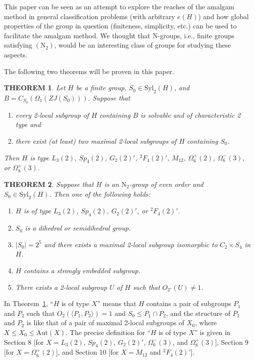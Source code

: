 \documentclass[11pt]{article}
\theoremstyle{plain}
\newtheorem{mainthm}{THEOREM}
\theoremstyle{stmplain}
\newcommand{\N}{\mathrm{N}}
\begin{document}
This paper can be seen as an attempt to explore the reaches of the amalgam
method in general classification problems (with arbitrary $e(H)$) and how
global properties of the group in question (finiteness, simplicity, etc.) can
be used to facilitate the amalgam method. We thought that $\N$-groups, i.e.,
finite groups satisfying $(\N_2)$, would be an interesting class of groups for
studying these aspects.

\noindent The following two theorems will be proven in this paper.

\begin{mainthm}\label{thm:1}
Let $H$ be a finite group, $S_0 \in \mathrm{Syl}_2(H)$, and
$B = C_{S_0}(\Omega_1(ZJ(S_0)))$. Suppose that
\begin{enumerate}
\item[(i)] every 2-local subgroup of $H$ containing $B$ is solvable and of
  characteristic 2 type and
\item[(ii)] there exist (at least) two maximal 2-local subgroups of $H$
  containing $S_0$.
\end{enumerate}
Then $H$ is type $L_3(2)$, $Sp_4(2)$, $G_2(2)'$, ${}^2F_4(2)'$, $M_{12}$,
$\Omega_6^+(2)$, $\Omega_6^-(3)$, or $\Omega_8^+(3)$.
\end{mainthm}

\begin{mainthm}\label{thm:2}
Suppose that $H$ is an $\N_2$-group of even order and $S_0 \in \mathrm{Syl}_2(H)$.
Then one of the following holds:
\begin{enumerate}
\item[(a)] $H$ is of type $L_3(2)$, $Sp_4(2)$, $G_2(2)'$, or ${}^2F_4(2)'$.
\item[(b)] $S_0$ is a dihedral or semidihedral group.
\item[(c)] $|S_0| = 2^5$ and there exists a maximal 2-local subgroup isomorphic to $C_2 \times S_4$ in $H$.
\item[(d)] $H$ contains a strongly embedded subgroup.
\item[(e)] There exists a 2-local subgroup $U$ of $H$ such that $O_{2'}(U) \ne 1$.
\end{enumerate}
\end{mainthm}

\noindent In Theorem~\ref{thm:1}, ``$H$ is of type $X$'' means that $H$ contains a
pair of subgroups $P_1$ and $P_2$ such that $O_2(\langle P_1, P_2 \rangle) = 1$
and $S_0 \le P_1 \cap P_2$, and the structure of $P_1$ and $P_2$ is like that
of a pair of maximal 2-local subgroups of $X_0$, where $X \le X_0 \le
\mathrm{Aut}(X)$. The precise definition for ``$H$ is of type $X$'' is given in
Section 8 [for $X = L_3(2)$, $Sp_4(2)$, $G_2(2)'$, $\Omega_6^-(3)$, and
$\Omega_8^+(3)$], Section 9 [for $X = \Omega_6^+(2)$], and Section 10 [for
$X = M_{12}$ and ${}^2F_4(2)'$].
\end{document}
